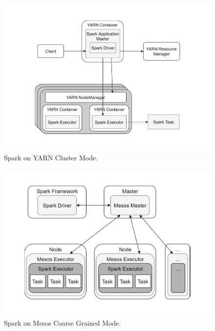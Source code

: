 \begin{figure}
	\centering
	\includegraphics[width=\columnwidth]{Images/spark_yarn_cluster_mode.pdf}  
	\caption[Spark on YARN Cluster Mode]{Spark on YARN Cluster Mode.}
	\label{fig:sparkOnYarnClusterMode}
\end{figure}
\begin{figure}
	\centering
	\includegraphics[width=\columnwidth]{Images/spark_mesos_coarse_grained_mode.pdf}  
	\caption[Spark on Mesos Coarse Grained Mode]{Spark on Mesos Coarse Grained Mode.}
	\label{fig:sparkOnMesosCoarseGrainedMode}
\end{figure}
